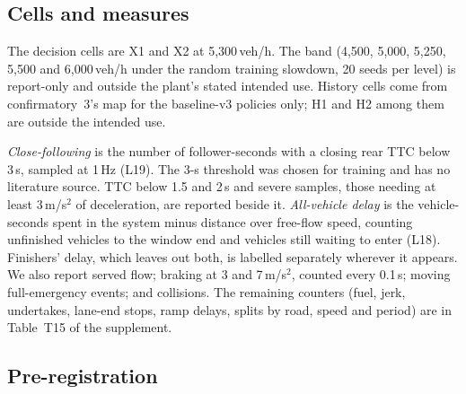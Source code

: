 \begin{table}[tbp]
\centering
{}
\caption{Controllers compared.}\label{tab:controllers}
\end{table}

\subsection{Cells and measures}\label{sec:cells_measures}

The decision cells are X1 and X2 at 5,300\,veh/h.
The band (4,500, 5,000, 5,250, 5,500 and 6,000\,veh/h under the random training slowdown, 20 seeds per level) is report-only and outside the plant's stated intended use.
History cells come from confirmatory~3's map for the baseline-v3 policies only; H1 and H2 among them are outside the intended use.

\emph{Close-following} is the number of follower-seconds with a closing rear TTC below 3\,s, sampled at 1\,Hz (L19).
The 3-s threshold was chosen for training  and has no literature source.
TTC below 1.5 and 2\,s and severe samples, those needing at least 3\,m/s$^2$ of deceleration, are reported beside it.
\emph{All-vehicle delay} is the vehicle-seconds spent in the system minus distance over free-flow speed, counting unfinished vehicles to the window end and vehicles still waiting to enter (L18).
Finishers' delay, which leaves out both, is labelled separately wherever it appears.
We also report served flow; braking at 3 and 7\,m/s$^2$, counted every 0.1\,s; moving full-emergency events; and collisions.
The remaining counters (fuel, jerk, undertakes, lane-end stops, ramp delays, splits by road, speed and period) are in Table~T15 of the supplement.

\subsection{Pre-registration}\label{sec:prereg}

